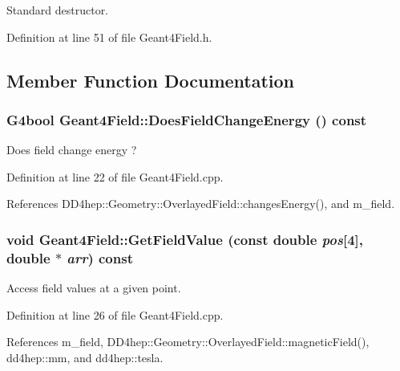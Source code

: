 Standard destructor. 

Definition at line 51 of file Geant4Field.h.

\subsection{Member Function Documentation}
\hypertarget{class_d_d4hep_1_1_simulation_1_1_geant4_field_a987ca37ab873ff5b2405e8f16c090786}{
\subsubsection[{DoesFieldChangeEnergy}]{\setlength{\rightskip}{0pt plus 5cm}G4bool Geant4Field::DoesFieldChangeEnergy () const}}
\label{class_d_d4hep_1_1_simulation_1_1_geant4_field_a987ca37ab873ff5b2405e8f16c090786}


Does field change energy ? 

Definition at line 22 of file Geant4Field.cpp.

References DD4hep::Geometry::OverlayedField::changesEnergy(), and m\_\-field.\hypertarget{class_d_d4hep_1_1_simulation_1_1_geant4_field_a1b890e2957fb750d360c0c518f3af0d4}{
\subsubsection[{GetFieldValue}]{\setlength{\rightskip}{0pt plus 5cm}void Geant4Field::GetFieldValue (const double {\em pos}\mbox{[}4\mbox{]}, \/  double $\ast$ {\em arr}) const}}
\label{class_d_d4hep_1_1_simulation_1_1_geant4_field_a1b890e2957fb750d360c0c518f3af0d4}


Access field values at a given point. 

Definition at line 26 of file Geant4Field.cpp.

References m\_\-field, DD4hep::Geometry::OverlayedField::magneticField(), dd4hep::mm, and dd4hep::tesla.

